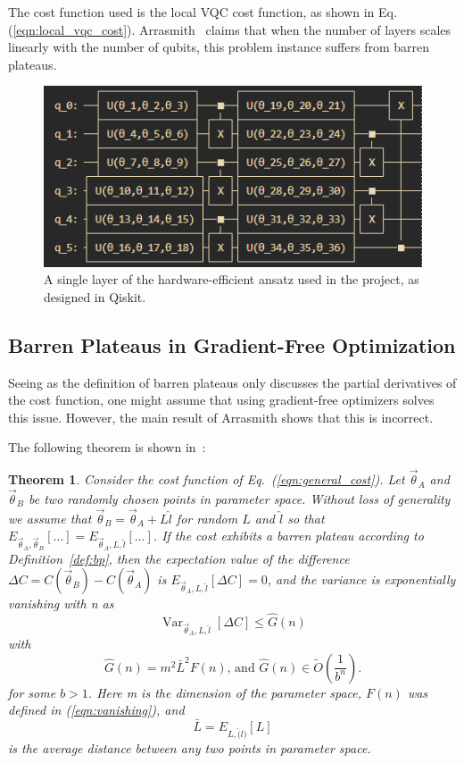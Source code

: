 \documentclass[a4paper,12pt]{article}
\newcommand{\thetas}{\vec{\theta}}
\DeclareMathOperator{\Var}{Var}
\newtheorem{theorem}{Theorem}
\begin{document}
The cost function used is the local VQC cost function, as shown in Eq. (\ref{eqn:local_vqc_cost}).
Arrasmith~\cite{arrasmith_effect_2021} claims that when the number of layers scales linearly with the number of qubits, this problem instance suffers from barren plateaus.

\begin{figure}[h]
    \centering
    \includegraphics{arrasmith_layer.png}
    \caption{A single layer of the hardware-efficient ansatz used in the project, as designed in Qiskit.}
    \label{fig:layer}
\end{figure}

\subsection{Barren Plateaus in Gradient-Free Optimization}
Seeing as the definition of barren plateaus only discusses the partial derivatives of the cost function, one might assume that using gradient-free optimizers solves this issue.
However, the main result of Arrasmith shows that this is incorrect.

The following theorem is shown in~\cite{arrasmith_effect_2021}:

\begin{theorem}
    Consider the cost function of Eq.~(\ref{eqn:general_cost}). Let ${\thetas}_A$ and $\thetas_B$ be two randomly chosen points in parameter space.
    Without loss of generality we assume that $\thetas_B = \thetas_A + L\hat{l}$ for random $L$ and $\hat{l}$ so that $E_{\thetas_A, \thetas_B}[\dots] = E_{\thetas_A, L, \hat{l}}[\dots]$.
    If the cost exhibits a barren plateau according to Definition~\ref{def:bp}, then the expectation value of the difference $\Delta C = C(\thetas_B) - C(\thetas_A)$ is $E_{\thetas_A, L, \hat{l}}[\Delta C] = 0$, and the variance is exponentially vanishing with n as 
    \begin{equation}
        \Var_{\thetas_A,L,\hat{l}}[\Delta C] \leq \hat{G}(n)
    \end{equation}
    with
    \begin{equation}
        \hat{G}(n) = m^2 \bar{L}^2 F(n)\textrm{,    and     } \hat{G}(n) \in \tilde{O}\left(\frac{1}{b^n}\right).
    \end{equation}
    for some $b>1$. Here m is the dimension of the parameter space, $F(n)$ was defined in (\ref{eqn:vanishing}), and
    \begin{equation}
        \bar{L} = E_{L,\hat(l)}[L]
    \end{equation}
    is the average distance between any two points in parameter space.
\end{theorem}
\end{document}
